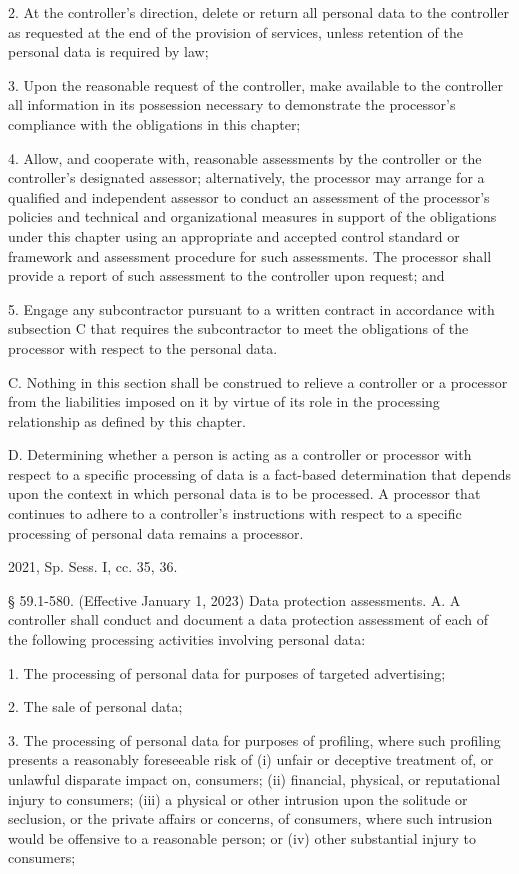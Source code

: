 2. At the controller's direction, delete or return all personal data to the controller as requested at the end of the provision of services, unless retention of the personal data is required by law;

3. Upon the reasonable request of the controller, make available to the controller all information in its possession necessary to demonstrate the processor's compliance with the obligations in this chapter;

4. Allow, and cooperate with, reasonable assessments by the controller or the controller's designated assessor; alternatively, the processor may arrange for a qualified and independent assessor to conduct an assessment of the processor's policies and technical and organizational measures in support of the obligations under this chapter using an appropriate and accepted control standard or framework and assessment procedure for such assessments. The processor shall provide a report of such assessment to the controller upon request; and

5. Engage any subcontractor pursuant to a written contract in accordance with subsection C that requires the subcontractor to meet the obligations of the processor with respect to the personal data.

C. Nothing in this section shall be construed to relieve a controller or a processor from the liabilities imposed on it by virtue of its role in the processing relationship as defined by this chapter.

D. Determining whether a person is acting as a controller or processor with respect to a specific processing of data is a fact-based determination that depends upon the context in which personal data is to be processed. A processor that continues to adhere to a controller's instructions with respect to a specific processing of personal data remains a processor.

2021, Sp. Sess. I, cc. 35, 36.

§ 59.1-580. (Effective January 1, 2023) Data protection assessments.
A. A controller shall conduct and document a data protection assessment of each of the following processing activities involving personal data:

1. The processing of personal data for purposes of targeted advertising;

2. The sale of personal data;

3. The processing of personal data for purposes of profiling, where such profiling presents a reasonably foreseeable risk of (i) unfair or deceptive treatment of, or unlawful disparate impact on, consumers; (ii) financial, physical, or reputational injury to consumers; (iii) a physical or other intrusion upon the solitude or seclusion, or the private affairs or concerns, of consumers, where such intrusion would be offensive to a reasonable person; or (iv) other substantial injury to consumers;

